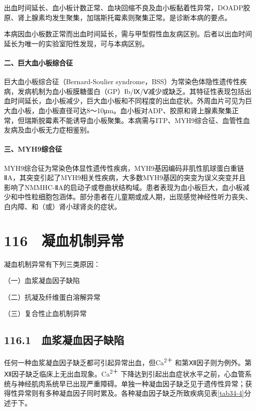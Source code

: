 出血时间延长、血小板计数正常、血块回缩不良及血小板黏着性异常，DOADP胶原、肾上腺素均发生聚集，加瑞斯托霉素则聚集正常。是诊断本病的要点。

本病因血小板数正常而出血时间延长，需与甲型假性血友病区别。后者以出血时间延长为唯一的实验室阳性发现，可与本病区别。

\paragraph{二、巨大血小板综合征}

巨大血小板综合征（Bernard-Soulier
syndrome，BSS）为常染色体隐性遗传性疾病，发病机制为血小板膜糖蛋白（GP）Ⅰb/Ⅸ/Ⅴ减少或缺乏。其特征性表现包括出血时间延长，血小板减少，巨大血小板和不同程度的出血症状。外周血片可见为巨大血小板，血小板直径可达8～10μm。血小板对ADP、胶原和肾上腺素聚集正常，但瑞斯脱霉素不能诱导血小板聚集。本病需与ITP、MYH9综合征、血管性血友病及血小板无力症相鉴别。

\paragraph{三、MYH9综合征}

MYH9综合征为常染色体显性遗传性疾病，MYH9基因编码非肌性肌球蛋白重链ⅡA，其突变引起了MYH9相关性疾病，大多数MYH9基因的突变为误义突变并且影响了NMMHC-ⅡA的启动子或卷曲状结构域。患者表现为血小板巨大，血小板减少和中性粒细胞包涵体。部分患者在儿童期或成人期，出现感觉神经性听力丧失、白内障、和（或）肾小球肾炎的症状。

\protect\hypertarget{text00265.html}{}{}

\section{116　凝血机制异常}

凝血机制异常有下列三类原因：

（一）血浆凝血因子缺陷

（二）抗凝及纤维蛋白溶解异常

（三）复合性止血机制异常

\subsection{116.1　血浆凝血因子缺陷}

任何一种血浆凝血因子缺乏都可引起异常出血，但Ca\textsuperscript{2＋}
和第Ⅻ因子则为例外。第Ⅻ因子缺乏临床上无出血现象。Ca\textsuperscript{2＋}
下降达到引起出血症状水平之前，心血管系统与神经肌肉系统早已出现严重障碍。单独一种凝血因子缺乏见于遗传性异常；获得性异常则有多种凝血因子同时累及。各种凝血因子缺乏所致疾病见表\ref{tab34-4}分述于下。

